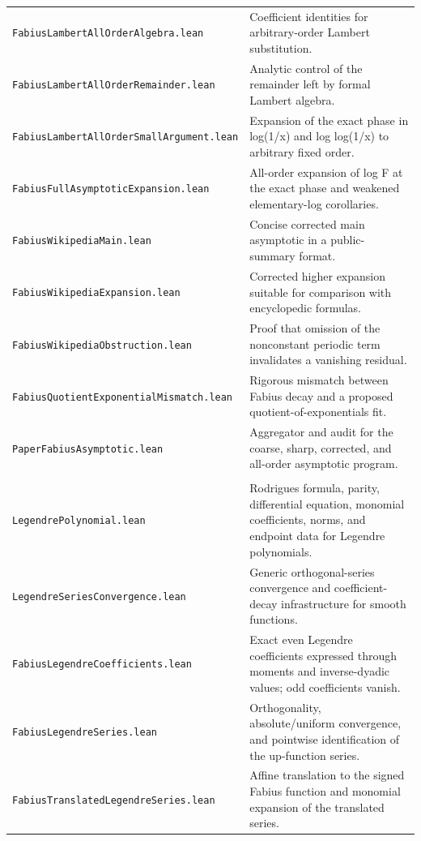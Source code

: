 \documentclass[11pt,oneside]{article}
\theoremstyle{definition}
\theoremstyle{remark}
\begin{document}
\begin{longtable}{>{\raggedright\arraybackslash}p{} >{\raggedright\arraybackslash}p{}}
\nolinkurl{FabiusLambertAllOrderAlgebra.lean} & Coefficient identities for arbitrary-order Lambert substitution. \\
\nolinkurl{FabiusLambertAllOrderRemainder.lean} & Analytic control of the remainder left by formal Lambert algebra. \\
\nolinkurl{FabiusLambertAllOrderSmallArgument.lean} & Expansion of the exact phase in log(1/x) and log log(1/x) to arbitrary fixed order. \\
\nolinkurl{FabiusFullAsymptoticExpansion.lean} & All-order expansion of log F at the exact phase and weakened elementary-log corollaries. \\
\nolinkurl{FabiusWikipediaMain.lean} & Concise corrected main asymptotic in a public-summary format. \\
\nolinkurl{FabiusWikipediaExpansion.lean} & Corrected higher expansion suitable for comparison with encyclopedic formulas. \\
\nolinkurl{FabiusWikipediaObstruction.lean} & Proof that omission of the nonconstant periodic term invalidates a vanishing residual. \\
\nolinkurl{FabiusQuotientExponentialMismatch.lean} & Rigorous mismatch between Fabius decay and a proposed quotient-of-exponentials fit. \\
\nolinkurl{PaperFabiusAsymptotic.lean} & Aggregator and audit for the coarse, sharp, corrected, and all-order asymptotic program. \\
\addlinespace[0.45em]
\multicolumn{2}{l}{\textbf{Legendre and approximation}}\\[0.25em]
\nolinkurl{LegendrePolynomial.lean} & Rodrigues formula, parity, differential equation, monomial coefficients, norms, and endpoint data for Legendre polynomials. \\
\nolinkurl{LegendreSeriesConvergence.lean} & Generic orthogonal-series convergence and coefficient-decay infrastructure for smooth functions. \\
\nolinkurl{FabiusLegendreCoefficients.lean} & Exact even Legendre coefficients expressed through moments and inverse-dyadic values; odd coefficients vanish. \\
\nolinkurl{FabiusLegendreSeries.lean} & Orthogonality, absolute/uniform convergence, and pointwise identification of the up-function series. \\
\nolinkurl{FabiusTranslatedLegendreSeries.lean} & Affine translation to the signed Fabius function and monomial expansion of the translated series. \\

\end{longtable}
\end{document}

